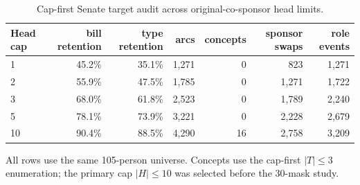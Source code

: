 \begin{table}[tbp]
\centering
\small
\caption{Cap-first Senate target audit across original-co-sponsor head limits.}
\label{tab:cap-audit}
\begin{tabular}{lrrrrrr}
\toprule
Head cap & bill retention & type retention & arcs & concepts & sponsor swaps & role events \\
\midrule
1 & 45.2\% & 35.1\% & 1,271 & 0 & 823 & 1,271 \\
2 & 55.9\% & 47.5\% & 1,785 & 0 & 1,271 & 1,722 \\
3 & 68.0\% & 61.8\% & 2,523 & 0 & 1,789 & 2,240 \\
5 & 78.1\% & 73.9\% & 3,221 & 0 & 2,228 & 2,679 \\
10 & 90.4\% & 88.5\% & 4,290 & 16 & 2,758 & 3,209 \\
\bottomrule
\end{tabular}
\par\vspace{2pt}\footnotesize All rows use the same 105-person universe. Concepts use the cap-first $|T|\leq3$ enumeration; the primary cap $|H|\leq10$ was selected before the 30-mask study.
\end{table}
